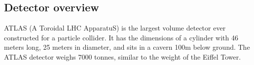 \subsection{Detector overview}

ATLAS (A Toroidal LHC ApparatuS) is the largest volume detector ever constructed for a particle collider.
It has the dimensions of a cylinder with 46 meters long, 25 meters in diameter, and sits in a cavern 100m below ground. 
The ATLAS detector weighs 7000 tonnes, similar to the weight of the Eiffel Tower.

